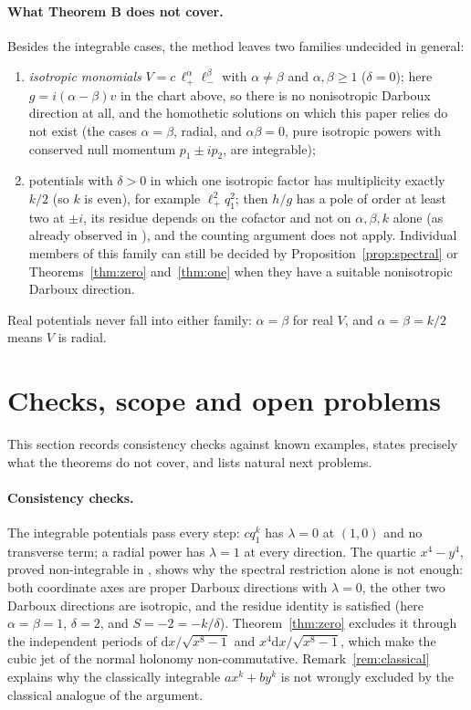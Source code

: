 \documentclass[11pt]{article}
\numberwithin{equation}{section}
\theoremstyle{definition}
\theoremstyle{remark}
\newcommand{\dd}{\mathrm d}
\begin{document}
\paragraph{What Theorem B does not cover.}
Besides the integrable cases, the method leaves two families undecided in general:
\begin{enumerate}[label=(\alph*)]
\item \emph{isotropic monomials} $V=c\,\ell_+^\alpha\ell_-^\beta$ with $\alpha\ne\beta$ and $\alpha,\beta\ge1$
($\delta=0$); here $g=i(\alpha-\beta)v$ in the chart above, so there is no nonisotropic Darboux direction at all, and
the homothetic solutions on which this paper relies do not exist (the cases $\alpha=\beta$, radial, and $\alpha\beta=0$,
pure isotropic powers with conserved null momentum $p_1\pm ip_2$, are integrable);
\item potentials with $\delta>0$ in which one isotropic factor has multiplicity exactly $k/2$ (so $k$ is even), for
example $\ell_+^2q_1^2$; then $h/g$ has a pole of order at least two at $\pm i$, its residue depends on the cofactor and not on $\alpha,\beta,k$ alone (as already observed in
\cite[Remark~2.2]{MP05}), and the counting argument does not apply. Individual members of this family can
still be decided by Proposition~\ref{prop:spectral} or Theorems~\ref{thm:zero} and~\ref{thm:one} when they have a
suitable nonisotropic Darboux direction.
\end{enumerate}
Real potentials never fall into either family: $\alpha=\beta$ for real $V$, and $\alpha=\beta=k/2$ means $V$ is radial.

\section{Checks, scope and open problems}\label{sec:discussion}

This section records consistency checks against known examples, states precisely what the theorems do not cover, and
lists natural next problems.

\paragraph{Consistency checks.}
The integrable potentials pass every step: $cq_1^k$ has $\lambda=0$ at $(1,0)$ and no transverse term; a radial power
has $\lambda=1$ at every direction. The quartic $x^4-y^4$, proved non-integrable in \cite[Sec.~V]{PSM23}, shows why
the spectral restriction alone is not enough: both coordinate axes are proper Darboux directions with $\lambda=0$, the
other two Darboux directions are isotropic, and the residue identity is satisfied (here $\alpha=\beta=1$, $\delta=2$, and $S=-2=-k/\delta$). Theorem~\ref{thm:zero} excludes it through the independent periods of $\dd x/\sqrt{x^8-1}$ and
$x^4\dd x/\sqrt{x^8-1}$, which make the cubic jet of the normal holonomy non-commutative. Remark~\ref{rem:classical}
explains why the classically integrable $ax^k+by^k$ is not wrongly excluded by the classical analogue of the argument.
\end{document}
